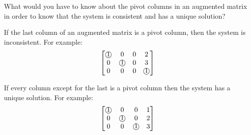 \documentclass{../mathhomework}
\newcommand{\circnum}[1]{\text{\textcircled{#1}}}
\begin{document}
\begin{problem}[1.2\#28]
    What would you have to know about the pivot columns in an augmented matrix in order to know that the system is consistent and has a unique solution?

    \begin{solution}
        If the last column of an augmented matrix is a pivot column, then the system is inconsistent. For example:
        \begin{equation*}
            \begin{bmatrix}
                \circnum{1} & 0 & 0 & 2 \\
                0 & \circnum{1} & 0 & 3 \\
                0 & 0 & 0 & \circnum{1} \\
            \end{bmatrix}
        \end{equation*}
    
        If every column except for the last is a pivot column then the system has a unique solution. For example:
        \begin{equation*}
            \begin{bmatrix}
                \circnum{1} & 0 & 0 & 1 \\
                0 & \circnum{1} & 0 & 2 \\
                0 & 0 & \circnum{1} & 3 \\
            \end{bmatrix}
        \end{equation*}
    \end{solution}
\end{problem}
\end{document}
